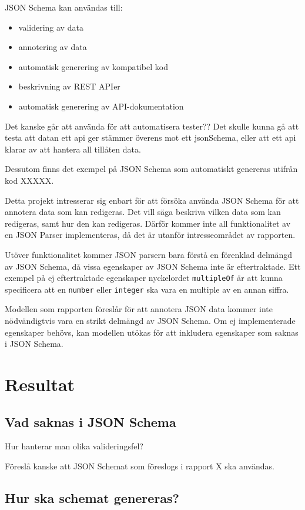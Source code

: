 \documentclass[swedish]{kththesis}
\begin{document}
JSON Schema kan användas till:
\begin{itemize}
	\item validering av data
	\item annotering av data
	\item automatisk generering av kompatibel kod
	\item beskrivning av REST APIer
	\item automatisk generering av API-dokumentation
\end{itemize}

Det kanske går att använda för att automatisera tester?? Det skulle kunna gå att testa att datan ett api ger stämmer överens mot ett jsonSchema, eller att ett api klarar av att hantera all tillåten data.

Dessutom finns det exempel på JSON Schema som automatiskt genereras utifrån kod XXXXX.

Detta projekt intresserar sig enbart för att försöka använda JSON Schema för att annotera data som kan redigeras. Det vill säga beskriva vilken data som kan redigeras, samt hur den kan redigeras. Därför kommer inte all funktionalitet av en JSON Parser implementeras, då det är utanför intresseområdet av rapporten.

Utöver funktionalitet kommer JSON parsern bara förstå en förenklad delmängd av JSON Schema, då vissa egenskaper av JSON Schema inte är eftertraktade. Ett exempel på ej eftertraktade egenskaper nyckelordet \texttt{multipleOf} är att kunna specificera att en \texttt{number} eller \texttt{integer} ska vara en multiple av en annan siffra.

Modellen som rapporten föreslår för att annotera JSON data kommer inte nödvändigtvis vara en strikt delmängd av JSON Schema. Om ej implementerade egenskaper behövs, kan modellen utökas för att inkludera egenskaper som saknas i JSON Schema.

\chapter{Resultat}

\section{Vad saknas i JSON Schema}
Hur hanterar man olika valideringsfel?

Föreslå kanske att JSON Schemat som föreslogs i rapport X ska användas.

\section{Hur ska schemat genereras?}
\end{document}
